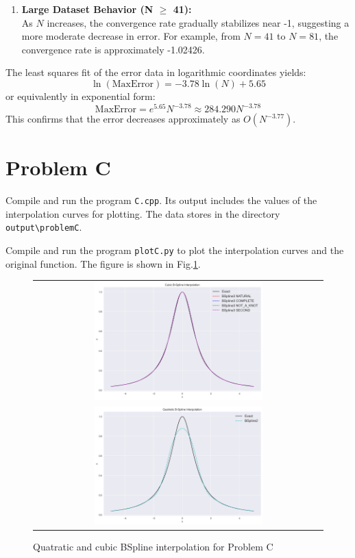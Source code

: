 \documentclass[a4paper]{article}
\begin{document}
\begin{sloppypar}
\begin{enumerate}
  \item \textbf{Large Dataset Behavior (N $\geq$ 41):} \\
        As \(N\) increases, the convergence rate gradually stabilizes near -1, suggesting a more moderate decrease in error. For example, from \(N=41\) to \(N=81\), the convergence rate is approximately -1.02426.
\end{enumerate}

The least squares fit of the error data in logarithmic coordinates yields:
\[
  \ln(\text{MaxError})=-3.78\ln(N)+5.65
\]
or equivalently in exponential form:
\[
  \text{MaxError} = e^{5.65}N^{-3.78} \approx 284.290N^{-3.78}
\]
This confirms that the error decreases approximately as \(O(N^{-3.77})\).

\section*{Problem C}
Compile and run the program \verb|C.cpp|. Its output includes the values of the interpolation curves for plotting. The data stores in the directory \verb|output\problemC|.

Compile and run the program \verb|plotC.py| to plot the interpolation curves
and the original function. The figure is shown in
Fig.\ref{fig:BSpline_interpolation_C}.

\begin{figure}[H]
  \centering
  \begin{tabular}{c}
    \includegraphics[width=0.6\textwidth]{../figure/problemC/Cubic_BSpline_interpolation.png} \\
    \includegraphics[width=0.6\textwidth]{../figure/problemC/Quatratic_BSpline_interpolation.png}
  \end{tabular}
  \renewcommand{\figurename}{Fig.}
  \caption{Quatratic and cubic BSpline interpolation for Problem C}
  \label{fig:BSpline_interpolation_C}
\end{figure}


\end{sloppypar}
\end{document}
